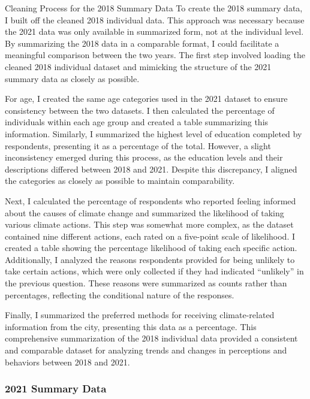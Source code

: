 \documentclass[
  letterpaper,
  DIV=11,
  numbers=noendperiod]{scrartcl}
\begin{document}
Cleaning Process for the 2018 Summary Data To create the 2018 summary
data, I built off the cleaned 2018 individual data. This approach was
necessary because the 2021 data was only available in summarized form,
not at the individual level. By summarizing the 2018 data in a
comparable format, I could facilitate a meaningful comparison between
the two years. The first step involved loading the cleaned 2018
individual dataset and mimicking the structure of the 2021 summary data
as closely as possible.

For age, I created the same age categories used in the 2021 dataset to
ensure consistency between the two datasets. I then calculated the
percentage of individuals within each age group and created a table
summarizing this information. Similarly, I summarized the highest level
of education completed by respondents, presenting it as a percentage of
the total. However, a slight inconsistency emerged during this process,
as the education levels and their descriptions differed between 2018 and
2021. Despite this discrepancy, I aligned the categories as closely as
possible to maintain comparability.

Next, I calculated the percentage of respondents who reported feeling
informed about the causes of climate change and summarized the
likelihood of taking various climate actions. This step was somewhat
more complex, as the dataset contained nine different actions, each
rated on a five-point scale of likelihood. I created a table showing the
percentage likelihood of taking each specific action. Additionally, I
analyzed the reasons respondents provided for being unlikely to take
certain actions, which were only collected if they had indicated
``unlikely'' in the previous question. These reasons were summarized as
counts rather than percentages, reflecting the conditional nature of the
responses.

Finally, I summarized the preferred methods for receiving
climate-related information from the city, presenting this data as a
percentage. This comprehensive summarization of the 2018 individual data
provided a consistent and comparable dataset for analyzing trends and
changes in perceptions and behaviors between 2018 and 2021.

\subsubsection{2021 Summary Data}\label{summary-data-1}
\end{document}
